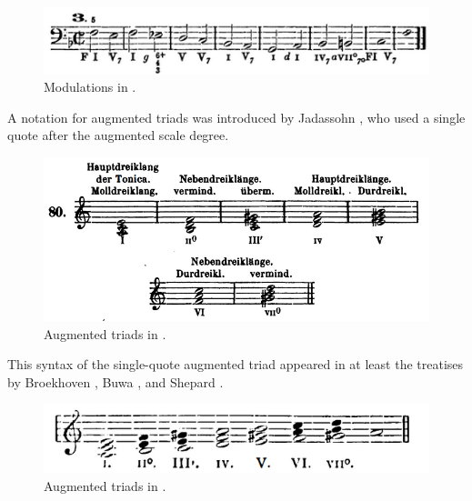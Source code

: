 \begin{figure}
    \centering
    \includegraphics[width=\textwidth]{figures/chapter/2/primary_sources/emery1879elements102.png}
    \caption{Modulations in \cite{emery1879elements}.}
    \label{fig:emery1879elements051}
\end{figure}

A notation for augmented triads was introduced by Jadassohn \cite{jadassohn1883lehrbuch}, who used a single quote after the augmented scale degree.

\begin{figure}
    \centering
    \includegraphics[width=\textwidth]{figures/chapter/2/primary_sources/jadassohn1883lehrbuch038.png}
    \caption{Augmented triads in \cite{jadassohn1883lehrbuch}.}
    \label{fig:jadassohn1883lehrbuch038}
\end{figure}

This syntax of the single-quote augmented triad appeared in at least the treatises by Broekhoven \cite{broekhoven1889system}, Buwa \cite{buwa1893schule}, and Shepard \cite{shepard1896harmony}.

\begin{figure}
    \centering
    \includegraphics[width=\textwidth]{figures/chapter/2/primary_sources/broekhoven1889system028.png}
    \caption{Augmented triads in \cite{broekhoven1889system}.}
    \label{fig:broekhoven1889system028}
\end{figure}

